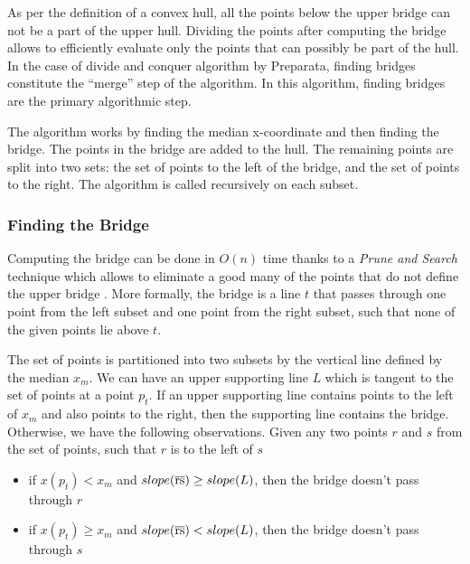 \documentclass{article}
\begin{document}
As per the definition of a convex hull, all the points below the upper bridge can not be a part of the upper hull. Dividing the points after computing the bridge allows to efficiently evaluate only the points that can possibly be part of the hull. In the case of divide and conquer algorithm by Preparata, finding bridges constitute the “merge” step of the algorithm. In this algorithm, finding bridges are the primary algorithmic step.

The algorithm works by finding the median x-coordinate and then finding the bridge. The points in the bridge are added to the hull. The remaining points are split into two sets: the set of points to the left of the bridge, and the set of points to the right. The algorithm is called recursively on each subset.

\subsubsection*{Finding the Bridge}
Computing the bridge can be done in $O(n)$ time thanks to a \textit{Prune and Search} technique which allows to eliminate a good many of the points that do not define the upper bridge \cite{pruneandsearch}. More formally, the bridge is a line $t$ that passes through one point from the left subset and one point from the right subset, such that none of the given points lie above $t$.

The set of points is partitioned into two subsets by the vertical line defined by the median $x_{m}$. We can have an upper supporting line $L$ which is tangent to the set of points at a point $p_t$. If an upper supporting line contains points to the left of $x_{m}$ and also points to the right, then the supporting line contains the bridge. Otherwise, we have the following observations. Given any two points $r$ and $s$ from the set of points, such that $r$ is to the left of $s$
\begin{itemize}
  \item if $x(p_{t}) < x_{m}$ and $slope(\overline{\rm rs}) \geq slope(L)$, then the bridge doesn't pass through $r$
  \item if $x(p_{t}) \geq x_{m}$ and $slope(\overline{\rm rs}) < slope(L)$, then the bridge doesn't pass through $s$
\end{itemize}
\end{document}

